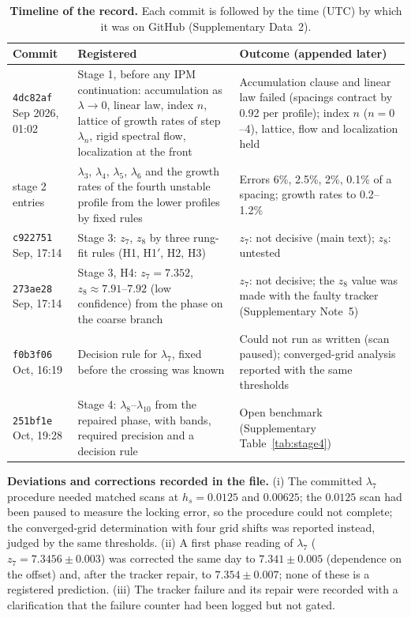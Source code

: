 \documentclass[10pt]{article}
\begin{document}
\begin{table}[h]
\centering
\caption{\textbf{Timeline of the record.} Each commit is followed by the time (UTC) by which it was on GitHub
(Supplementary Data~2).}
\label{tab:time}
\small
\begin{tabular}{>{\raggedright\arraybackslash}p{2.3cm}>{\raggedright\arraybackslash}p{6.2cm}>{\raggedright\arraybackslash}p{6.4cm}}
\toprule
Commit & Registered & Outcome (appended later)\\
\midrule
\texttt{4dc82af}\newline 30 Sep 2026, 01:02 & Stage 1, before any IPM continuation: accumulation as $\lambda\to0$, linear law, index $n$, lattice
of growth rates of step $\lambda_n$, rigid spectral flow, localization at the front & Accumulation clause and linear
law failed (spacings contract by 0.92 per profile); index $n$ ($n=0$--4), lattice, flow and localization held\\
stage 2 entries & $\lambda_3$, $\lambda_4$, $\lambda_5$, $\lambda_6$ and the growth rates of the fourth unstable profile
from the lower profiles by fixed rules & Errors 6\%, 2.5\%, 2\%, 0.1\% of a spacing; growth rates to 0.2--1.2\%\\
\texttt{c922751}\newline 30 Sep, 17:14 & Stage 3: $z_7$, $z_8$ by three rung-fit rules (H1, H1$'$, H2, H3) & $z_7$: not decisive (main
text); $z_8$: untested\\
\texttt{273ae28}\newline 30 Sep, 17:14 & Stage 3, H4: $z_7=7.352$, $z_8\approx7.91$--$7.92$ (low confidence) from the phase on the coarse
branch & $z_7$: not decisive; the $z_8$ value was made with the faulty tracker (Supplementary Note~5)\\
\texttt{f0b3f06}\newline 1 Oct, 16:19 & Decision rule for $\lambda_7$, fixed before the crossing was known & Could not run as written (scan
paused); converged-grid analysis reported with the same thresholds\\
\texttt{251bf1e}\newline 1 Oct, 19:28 & Stage 4: $\lambda_8$--$\lambda_{10}$ from the repaired phase, with bands, required precision and a
decision rule & Open benchmark (Supplementary Table~\ref{tab:stage4})\\
\bottomrule
\end{tabular}
\end{table}

\textbf{Deviations and corrections recorded in the file.} (i) The committed $\lambda_7$ procedure needed matched scans
at $h_s=0.0125$ and $0.00625$; the $0.0125$ scan had been paused to measure the locking error, so the procedure could
not complete; the converged-grid determination with four grid shifts was reported instead, judged by the same
thresholds. (ii) A first phase reading of $\lambda_7$ ($z_7=7.3456\pm0.003$) was corrected the same day to
$7.341\pm0.005$ (dependence on the offset) and, after the tracker repair, to $7.354\pm0.007$; none of these is a
registered prediction. (iii) The tracker failure and its repair were recorded with a clarification that the failure
counter had been logged but not gated.
\end{document}
